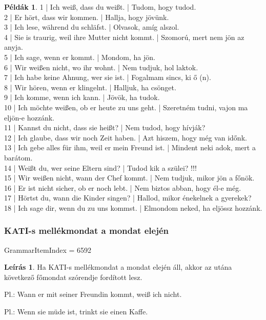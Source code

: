 \documentclass{article}
\theoremstyle{definition}
\newtheorem*{exmp}{Példák}
\newtheorem*{desc}{Leírás}
\begin{document}
\begin{exmp}
1 | Ich weiß, dass du weißt. | Tudom, hogy tudod.\\
2 | Er hört, dass wir kommen. | Hallja, hogy jövünk.\\
3 | Ich lese, während du schläfst. | Olvasok, amíg alszol.\\
4 | Sie is traurig, weil ihre Mutter nicht kommt. | Szomorú, mert nem jön az anyja.\\
5 | Ich sage, wenn er kommt. | Mondom, ha jön.\\
6 | Wir weißen nicht, wo ihr wohnt. | Nem tudjuk, hol laktok.\\
7 | Ich habe keine Ahnung, wer sie ist. | Fogalmam sincs, ki ő (n).\\
8 | Wir hören, wenn er klingelnt. | Halljuk, ha csönget.\\
9 | Ich komme, wenn ich kann. | Jövök, ha tudok.\\
10 | Ich möchte weißen, ob er heute zu uns geht. | Szeretném tudni, vajon ma eljön-e hozzánk.\\
11 | Kannst du nicht, dass sie heißt? | Nem tudod, hogy hívják?\\
12 | Ich glaube, dass wir noch Zeit haben. | Azt hiszem, hogy még van időnk.\\
13 | Ich gebe alles für ihm, weil er mein Freund ist. | Mindent neki adok, mert a barátom.\\
14 | Weißt du, wer seine Eltern sind? | Tudod kik a szülei? !!!\\
15 | Wir weißen nicht, wann der Chef kommt. | Nem tudjuk, mikor jön a főnök.\\
16 | Er ist nicht sicher, ob er noch lebt. | Nem biztos abban, hogy él-e még.\\
17 | Hörtst du, wann die Kinder singen? | Hallod, mikor énekelnek a gyerekek?\\
18 | Ich sage dir, wenn du zu uns kommst. | Elmondom neked, ha eljössz hozzánk.\\
\end{exmp}

\subsubsection{KATI-s mellékmondat a mondat elején}

GrammarItemIndex = 6592

\begin{desc}
Ha KATI-s mellékmondat a mondat elején áll, akkor az utána következő főmondat szórendje fordított lesz.

Pl.: Wann er mit seiner Freundin kommt, weiß ich nicht.

Pl.: Wenn sie müde ist, trinkt sie einen Kaffe.
\end{desc}
\end{document}
